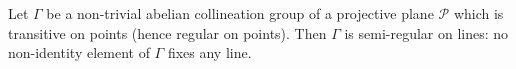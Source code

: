 Let $\Gamma$ be a non-trivial abelian collineation group of a projective plane $\mathcal{P}$ which is transitive on points (hence regular on points). Then $\Gamma$ is semi-regular on lines: no non-identity element of $\Gamma$ fixes any line.
